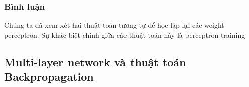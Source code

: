 \subsubsection{Bình luận}

Chúng ta đã xem xét hai thuật toán tương tự để học lặp lại các weight perceptron. Sự khác biệt chính giữa các thuật toán này là perceptron training

\subsection{Multi-layer network và thuật toán Backpropagation}

